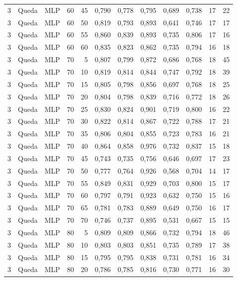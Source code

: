 \begin{longtable}{ccclrrrrrrrr}
3 & Queda & MLP & 60 & 45 & 0,790 & 0,778 & 0,795 & 0,689 & 0,738 & 17 & 22 \\
3 & Queda & MLP & 60 & 50 & 0,819 & 0,793 & 0,893 & 0,641 & 0,746 & 17 & 17 \\
3 & Queda & MLP & 60 & 55 & 0,860 & 0,839 & 0,893 & 0,735 & 0,806 & 17 & 16 \\
3 & Queda & MLP & 60 & 60 & 0,835 & 0,823 & 0,862 & 0,735 & 0,794 & 16 & 18 \\
3 & Queda & MLP & 70 & 5 & 0,807 & 0,799 & 0,872 & 0,686 & 0,768 & 18 & 45 \\
3 & Queda & MLP & 70 & 10 & 0,819 & 0,814 & 0,844 & 0,747 & 0,792 & 18 & 39 \\
3 & Queda & MLP & 70 & 15 & 0,805 & 0,798 & 0,856 & 0,697 & 0,768 & 18 & 25 \\
3 & Queda & MLP & 70 & 20 & 0,804 & 0,798 & 0,839 & 0,716 & 0,772 & 18 & 26 \\
3 & Queda & MLP & 70 & 25 & 0,830 & 0,824 & 0,901 & 0,719 & 0,800 & 16 & 22 \\
3 & Queda & MLP & 70 & 30 & 0,822 & 0,814 & 0,867 & 0,722 & 0,788 & 17 & 21 \\
3 & Queda & MLP & 70 & 35 & 0,806 & 0,804 & 0,855 & 0,723 & 0,783 & 16 & 21 \\
3 & Queda & MLP & 70 & 40 & 0,864 & 0,858 & 0,976 & 0,732 & 0,837 & 15 & 18 \\
3 & Queda & MLP & 70 & 45 & 0,743 & 0,735 & 0,756 & 0,646 & 0,697 & 17 & 23 \\
3 & Queda & MLP & 70 & 50 & 0,777 & 0,764 & 0,926 & 0,568 & 0,704 & 14 & 17 \\
3 & Queda & MLP & 70 & 55 & 0,849 & 0,831 & 0,929 & 0,703 & 0,800 & 15 & 17 \\
3 & Queda & MLP & 70 & 60 & 0,797 & 0,791 & 0,923 & 0,632 & 0,750 & 15 & 16 \\
3 & Queda & MLP & 70 & 65 & 0,781 & 0,783 & 0,889 & 0,649 & 0,750 & 16 & 17 \\
3 & Queda & MLP & 70 & 70 & 0,746 & 0,737 & 0,895 & 0,531 & 0,667 & 15 & 15 \\
3 & Queda & MLP & 80 & 5 & 0,809 & 0,809 & 0,866 & 0,732 & 0,794 & 18 & 46 \\
3 & Queda & MLP & 80 & 10 & 0,803 & 0,803 & 0,851 & 0,735 & 0,789 & 17 & 38 \\
3 & Queda & MLP & 80 & 15 & 0,795 & 0,795 & 0,838 & 0,731 & 0,781 & 16 & 34 \\
3 & Queda & MLP & 80 & 20 & 0,786 & 0,785 & 0,816 & 0,730 & 0,771 & 16 & 30 \\

\end{longtable}
